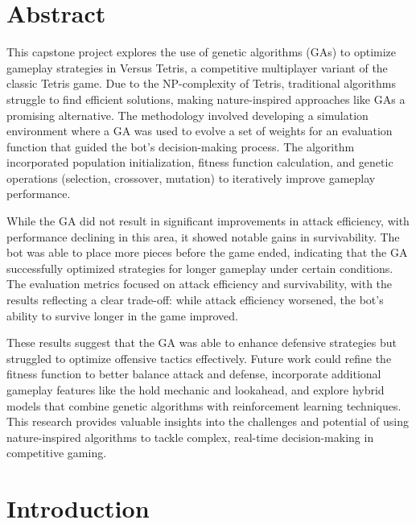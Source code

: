 \documentclass[a4paper, 12pt]{extreport}
\begin{document}
	
	\chapter*{Abstract}
	
		This capstone project explores the use of genetic algorithms (GAs) to optimize gameplay strategies in Versus Tetris, a competitive multiplayer variant of the classic Tetris game. Due to the NP-complexity of Tetris, traditional algorithms struggle to find efficient solutions, making nature-inspired approaches like GAs a promising alternative. The methodology involved developing a simulation environment where a GA was used to evolve a set of weights for an evaluation function that guided the bot’s decision-making process. The algorithm incorporated population initialization, fitness function calculation, and genetic operations (selection, crossover, mutation) to iteratively improve gameplay performance.
		
		While the GA did not result in significant improvements in attack efficiency, with performance declining in this area, it showed notable gains in survivability. The bot was able to place more pieces before the game ended, indicating that the GA successfully optimized strategies for longer gameplay under certain conditions. The evaluation metrics focused on attack efficiency and survivability, with the results reflecting a clear trade-off: while attack efficiency worsened, the bot's ability to survive longer in the game improved.
		
		These results suggest that the GA was able to enhance defensive strategies but struggled to optimize offensive tactics effectively. Future work could refine the fitness function to better balance attack and defense, incorporate additional gameplay features like the hold mechanic and lookahead, and explore hybrid models that combine genetic algorithms with reinforcement learning techniques. This research provides valuable insights into the challenges and potential of using nature-inspired algorithms to tackle complex, real-time decision-making in competitive gaming.
		
	
	\tableofcontents
	
	\listoftables
	
	\listoffigures
	
	\chapter{Introduction}
	
\end{document}
